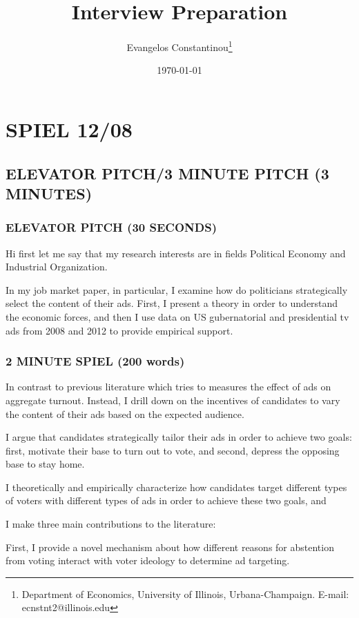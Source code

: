 \documentclass[12pt]{article}
\author{Evangelos Constantinou\thanks{Department of Economics, University of Illinois, Urbana-Champaign. E-mail: ecnstnt2@illinois.edu}}
\date{\today}
\title{Interview Preparation}
\theoremstyle{plain}
\theoremstyle{plain}
\theoremstyle{plain}
\theoremstyle{plain}
\theoremstyle{plain}
\theoremstyle{plain}
\begin{document}
\maketitle

\section{SPIEL 12/08}
\label{sec:orga637b74}

\subsection{ELEVATOR PITCH/3 MINUTE PITCH (3 MINUTES)}
\label{sec:org286147b}

\subsubsection{ELEVATOR PITCH (30 SECONDS)}
\label{sec:orgfcf9809}

Hi first let me say that my research interests are in fields Political Economy and Industrial Organization.

In my job market paper, in particular, I examine how do politicians strategically select the content of their ads.
First, I present a theory in order to understand the economic forces,
and then I use data on US gubernatorial and presidential tv ads from 2008 and 2012 to provide empirical support.

\subsubsection{2 MINUTE SPIEL (200 words)}
\label{sec:orgbf11ca7}

In contrast to previous literature which tries to measures the effect of ads on aggregate turnout.
Instead, I drill down on the incentives of candidates to vary the content of their ads based on the expected audience.

I argue that candidates strategically tailor their ads in order to achieve two goals:
first, motivate their base to turn out to vote,
and second, depress the opposing base to stay home.

I theoretically and empirically characterize how candidates target different types of voters with different types of ads in order to achieve these two goals, and

I make three main contributions to the literature:

First, I provide a novel mechanism about how different reasons for abstention from voting interact with voter ideology to determine ad targeting.
\end{document}
